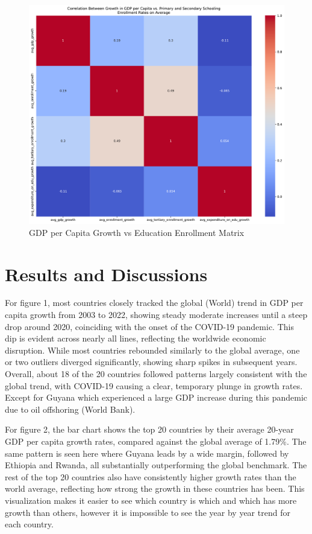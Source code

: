 \documentclass[
  letterpaper,
  DIV=11,
  numbers=noendperiod]{scrartcl}
\begin{document}
\begin{figure}[H]

{\centering \includegraphics{report_files/figure-pdf/correlation-output-2.pdf}

}

\caption{GDP per Capita Growth vs Education Enrollment Matrix}

\end{figure}%

\section{Results and Discussions}\label{results-and-discussions}

For figure 1, most countries closely tracked the global (World) trend in
GDP per capita growth from 2003 to 2022, showing steady moderate
increases until a steep drop around 2020, coinciding with the onset of
the COVID-19 pandemic. This dip is evident across nearly all lines,
reflecting the worldwide economic disruption. While most countries
rebounded similarly to the global average, one or two outliers diverged
significantly, showing sharp spikes in subsequent years. Overall, about
18 of the 20 countries followed patterns largely consistent with the
global trend, with COVID-19 causing a clear, temporary plunge in growth
rates. Except for Guyana which experienced a large GDP increase during
this pandemic due to oil offshoring (World Bank).

For figure 2, the bar chart shows the top 20 countries by their average
20-year GDP per capita growth rates, compared against the global average
of 1.79\%. The same pattern is seen here where Guyana leads by a wide
margin, followed by Ethiopia and Rwanda, all substantially outperforming
the global benchmark. The rest of the top 20 countries also have
consistently higher growth rates than the world average, reflecting how
strong the growth in these countries has been. This visualization makes
it easier to see which country is which and which has more growth than
others, however it is impossible to see the year by year trend for each
country.
\end{document}
